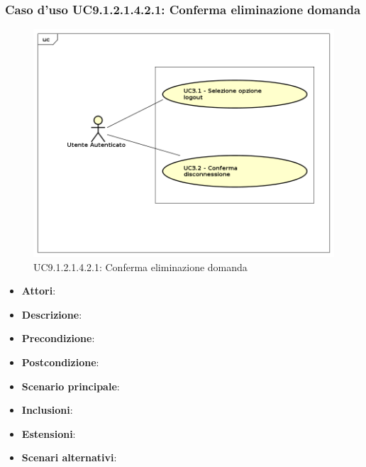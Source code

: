 							\subsubsection{Caso d'uso UC9.1.2.1.4.2.1: Conferma eliminazione domanda}
							\label{UC9.1.2.1.4.2.1}
							\begin{figure}[h]
								\centering
								\includegraphics[scale=0.7,keepaspectratio]{UML/UC9.png}
								\caption{UC9.1.2.1.4.2.1: Conferma eliminazione domanda}
							\end{figure}
							\FloatBarrier
							\begin{itemize}
								\item \textbf{Attori}: 
								\item \textbf{Descrizione}: 
								\item \textbf{Precondizione}: 
								\item \textbf{Postcondizione}: 
								\item \textbf{Scenario principale}:
								\item \textbf{Inclusioni}:
								\item \textbf{Estensioni}:
								\item \textbf{Scenari alternativi}:
							\end{itemize}
																

